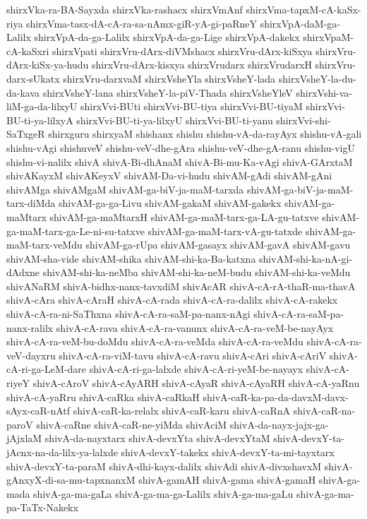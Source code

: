 {shirxVka-ra-BA-Sayxda
shirxVka-rashacx
shirxVmAnf
shirxVma-tapxM-cA-kaSx-riya
shirxVma-tasx-dA-cA-ra-sa-nAmx-giR-yA-gi-paRneY
shirxVpA-daM-ga-Lalilx
shirxVpA-da-ga-Lalilx
shirxVpA-da-ga-Lige
shirxVpA-dakekx
shirxVpaM-cA-kaSxri
shirxVpati
shirxVru-dArx-diVMshacx
shirxVru-dArx-kiSxya
shirxVru-dArx-kiSx-ya-hudu
shirxVru-dArx-kisxya
shirxVrudarx
shirxVrudarxH
shirxVru-darx-sUkatx
shirxVru-darxvaM
shirxVsheYla
shirxVsheY-lada
shirxVsheY-la-du-da-kava
shirxVsheY-lana
shirxVsheY-la-piV-Thada
shirxVsheYleV
shirxVshi-va-liM-ga-da-lilxyU
shirxVvi-BUti
shirxVvi-BU-tiya
shirxVvi-BU-tiyaM
shirxVvi-BU-ti-ya-lilxyA
shirxVvi-BU-ti-ya-lilxyU
shirxVvi-BU-ti-yanu
shirxVvi-shi-SaTxgeR
shirxguru
shirxyaM
shishanx
shishu
shishu-vA-da-rayAyx
shishu-vA-gali
shishu-vAgi
shishuveV
shishu-veV-dhe-gAra
shishu-veV-dhe-gA-ranu
shishu-vigU
shishu-vi-nalilx
shivA
shivA-Bi-dhAnaM
shivA-Bi-mu-Ka-vAgi
shivA-GArxtaM
shivAKayxM
shivAKeyxV
shivAM-Da-vi-hudu
shivAM-gAdi
shivAM-gAni
shivAMga
shivAMgaM
shivAM-ga-biV-ja-maM-tarxda
shivAM-ga-biV-ja-maM-tarx-diMda
shivAM-ga-ga-Livu
shivAM-gakaM
shivAM-gakekx
shivAM-ga-maMtarx
shivAM-ga-maMtarxH
shivAM-ga-maM-tarx-ga-LA-gu-tatxve
shivAM-ga-maM-tarx-ga-Le-ni-su-tatxve
shivAM-ga-maM-tarx-vA-gu-tatxde
shivAM-ga-maM-tarx-veMdu
shivAM-ga-rUpa
shivAM-gasayx
shivAM-gavA
shivAM-gavu
shivAM-sha-vide
shivAM-shika
shivAM-shi-ka-Ba-katxna
shivAM-shi-ka-nA-gi-dAdxne
shivAM-shi-ka-neMba
shivAM-shi-ka-neM-budu
shivAM-shi-ka-veMdu
shivANaRM
shivA-bidhx-nanx-tavxdiM
shivAcAR
shivA-cA-rA-thaR-ma-thavA
shivA-cAra
shivA-cAraH
shivA-cA-rada
shivA-cA-ra-dalilx
shivA-cA-rakekx
shivA-cA-ra-ni-SaThxna
shivA-cA-ra-saM-pa-nanx-nAgi
shivA-cA-ra-saM-pa-nanx-ralilx
shivA-cA-rava
shivA-cA-ra-vanunx
shivA-cA-ra-veM-be-nayAyx
shivA-cA-ra-veM-bu-doMdu
shivA-cA-ra-veMda
shivA-cA-ra-veMdu
shivA-cA-ra-veV-dayxru
shivA-cA-ra-viM-tavu
shivA-cA-ravu
shivA-cAri
shivA-cAriV
shivA-cA-ri-ga-LeM-dare
shivA-cA-ri-ga-lalxde
shivA-cA-ri-yeM-be-nayayx
shivA-cA-riyeY
shivA-cAroV
shivA-cAyARH
shivA-cAyaR
shivA-cAyaRH
shivA-cA-yaRnu
shivA-cA-yaRru
shivA-caRka
shivA-caRkaH
shivA-caR-ka-pa-da-davxM-davx-sAyx-caR-nAtf
shivA-caR-ka-relalx
shivA-caR-karu
shivA-caRnA
shivA-caR-na-paroV
shivA-caRne
shivA-caR-ne-yiMda
shivAciM
shivA-da-nayx-jajx-ga-jAjxlaM
shivA-da-nayxtarx
shivA-devxYta
shivA-devxYtaM
shivA-devxY-ta-jAcnx-na-da-lilx-ya-lalxde
shivA-devxY-takekx
shivA-devxY-ta-mi-tayxtarx
shivA-devxY-ta-paraM
shivA-dhi-kayx-dalilx
shivAdi
shivA-divxshavxM
shivA-gAnxyX-di-sa-mu-tapxnanxM
shivA-gamAH
shivA-gama
shivA-gamaH
shivA-ga-mada
shivA-ga-ma-gaLa
shivA-ga-ma-ga-Lalilx
shivA-ga-ma-gaLu
shivA-ga-ma-pa-TaTx-Nakekx
}

